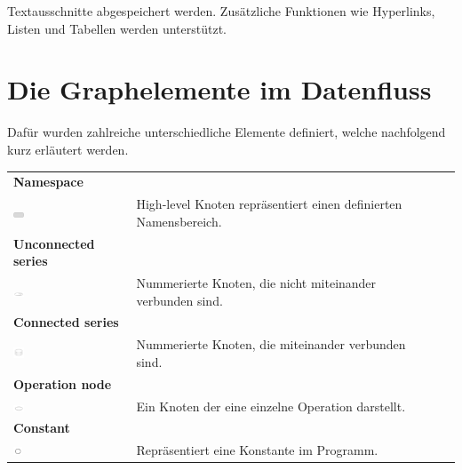 Textausschnitte abgespeichert werden. Zusätzliche Funktionen wie Hyperlinks, Listen und Tabellen werden unterstützt.





\newpage

\section{Die Graphelemente im Datenfluss}

 Dafür wurden zahlreiche unterschiedliche Elemente definiert, welche nachfolgend kurz erläutert werden. 
\\

\begin{tabular}{ p{4cm}p{10.8cm} ll }

\textbf{Namespace} \tabularnewline 
\includegraphics[width=0.1\textwidth]{images/Kapitel_3/namespace.png}
\label{fig:namespace}
 & High-level Knoten repräsentiert einen definierten Namensbereich.   \tabularnewline
  
\textbf{Unconnected series} \tabularnewline 
\includegraphics[width=0.1\textwidth]{images/Kapitel_3/Unconnected_series.png}
\label{fig:Unconnected_series}
 & Nummerierte Knoten, die nicht miteinander verbunden sind. \tabularnewline
  
\textbf{Connected series} \tabularnewline 
\includegraphics[width=0.1\textwidth]{images/Kapitel_3/Connected_series.png}
\label{fig:Connected_series}
 & Nummerierte Knoten, die miteinander verbunden sind. \tabularnewline 
 
\textbf{Operation node} \tabularnewline 
\includegraphics[width=0.1\textwidth]{images/Kapitel_3/Operation_node.png}
\label{fig:Operation_node}
 & Ein Knoten der eine einzelne Operation darstellt.  \tabularnewline 
 
\textbf{Constant} \tabularnewline 
\includegraphics[width=0.08\textwidth]{images/Kapitel_3/Constant.png}
\label{fig:Constant}
 & Repräsentiert eine Konstante im Programm.  \tabularnewline 


\end{tabular}

